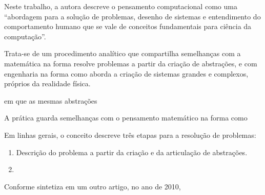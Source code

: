 Neste trabalho, a autora descreve o pensamento computacional como uma ``abordagem para a solução de problemas, desenho de sistemas e entendimento do comportamento humano que se vale de conceitos fundamentais para ciência da computação''. \cite[tradução nossa]{wing2006} 

Trata-se de um procedimento analítico que compartilha semelhanças com a matemática na forma resolve problemas a partir da criação de abstrações, e com engenharia na forma como aborda a criação de sistemas grandes e complexos, próprios da realidade física. \cite[tradução nossa]{wing2008}





em que as mesmas abstrações 





A prática guarda semelhanças com o pensamento matemático na forma como


Em linhas gerais, o conceito descreve três etapas para a resolução de problemas:

\begin{enumerate}
  \item Descrição do problema a partir da criação e da articulação de abstrações.
  \item 

\end{enumerate}




Conforme sintetiza em um outro artigo, no ano de 2010,






